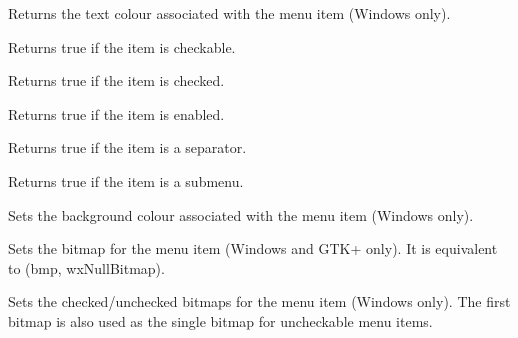 
Returns the text colour associated with the menu item (Windows only).


\label{wxmenuitemischeckable}


Returns true if the item is checkable.


\label{wxmenuitemischecked}


Returns true if the item is checked.


\label{wxmenuitemisenabled}


Returns true if the item is enabled.


\label{wxmenuitemisseparator}


Returns true if the item is a separator.


\label{wxmenuitemissubmenu}


Returns true if the item is a submenu.


\label{wxmenuitemsetbackgroundcolour}


Sets the background colour associated with the menu item (Windows only).


\label{wxmenuitemsetbitmap}


Sets the bitmap for the menu item (Windows and GTK+ only). It is
equivalent to (bmp, wxNullBitmap).


\label{wxmenuitemsetbitmaps}


Sets the checked/unchecked bitmaps for the menu item (Windows only). The first bitmap
is also used as the single bitmap for uncheckable menu items.


